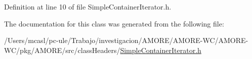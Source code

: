 Definition at line 10 of file SimpleContainerIterator.h.



The documentation for this class was generated from the following file:\begin{DoxyCompactItemize}
\item 
/Users/mcasl/pc-\/ule/Trabajo/investigacion/AMORE/AMORE-\/WC/AMORE-\/WC/pkg/AMORE/src/classHeaders/\hyperlink{_simple_container_iterator_8h}{SimpleContainerIterator.h}\end{DoxyCompactItemize}

